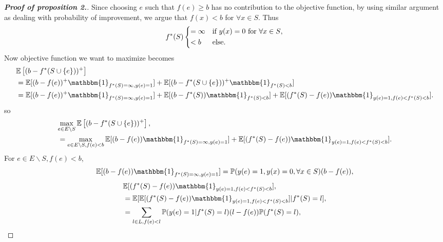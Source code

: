 \documentclass[12pt]{article}
\newcommand{\E}{\mathbb{E}}
\begin{document}
\begin{proof}[\bf{Proof of proposition 2.}]
Since choosing $e$ such that $f(e) \geq b$ has no contribution to the objective function, by using similar argument as dealing with probability of improvement, we argue that $f(x)<b$ for $\forall x \in S$. Thus
\begin{equation*}
f^*(S)  \begin{dcases}
         =\infty & \text{if $y(x)=0$ for $\forall x \in S$},\\
         < b & \text{else}.
 \end{dcases}
\end{equation*}
Now objective function we want to maximize becomes
\begin{equation*}
  \begin{split}
    &\E \left[ (b-f^*(S \cup \{e\}))^+ \right] \\
    &= \E[(b-f(e))^+ \mathbbm{1}_{f^*(S)=\infty, y(e)=1}]+ \E[ (b-f^*(S \cup \{e\}))^+ \mathbbm{1}_{f^*(S)<b}] \\
    &= \E[(b-f(e))^+ \mathbbm{1}_{f^*(S)=\infty, y(e)=1}]+ \E[ (b-f^*(S)) \mathbbm{1}_{f^*(S)<b}] + \E[(f^*(S)-f(e)) \mathbbm{1}_{y(e)=1, f(e)<f^*(S)<b}].
  \end{split}
\end{equation*}
so
\begin{equation} \label{eq:EI2}
  \begin{split}
    &\underset{e \in E \backslash S}{\max} \, \E \left[ (b-f^*(S \cup \{e\}))^+ \right], \\
    &= \underset{e \in E \backslash S, f(e)<b}{\max} \, \E[(b-f(e)) \mathbbm{1}_{f^*(S)=\infty, y(e)=1}]+\E[(f^*(S)-f(e)) \mathbbm{1}_{y(e)=1, f(e)<f^*(S)<b}].
  \end{split}
\end{equation}
For $e \in E \backslash S, f(e)<b$,
\begin{equation}
    \E[(b-f(e)) \mathbbm{1}_{f^*(S)=\infty, y(e)=1}] = \mathbb{P}(y(e)=1, y(x)=0, \forall x \in S)(b-f(e)), 
  \label{eq:EI3}
\end{equation}
\begin{equation*}
  \begin{split}
    &\E[(f^*(S)-f(e)) \mathbbm{1}_{y(e)=1, f(e)<f^*(S)<b}], \\
    &=\E[\E[(f^*(S)-f(e)) \mathbbm{1}_{y(e)=1, f(e)<f^*(S)<b}]|f^*(S)=l], \\
    &= \sum_{l \in L, f(e)<l} \mathbb{P}(y(e)=1|f^*(S)=l)(l-f(e))\mathbb{P}(f^*(S)=l),\\

\end{split}
\end{equation*}
\end{proof}
\end{document}

